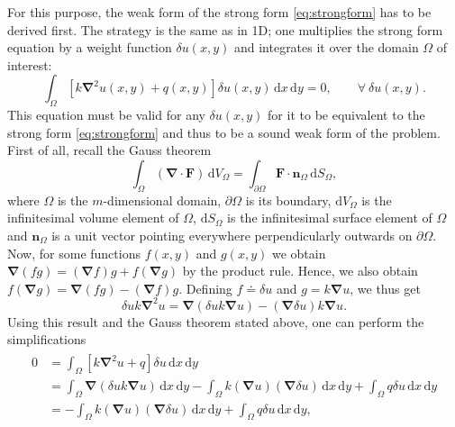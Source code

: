 \documentclass[a4paper,11pt]{article}
\numberwithin{equation}{section}
\newcommand\vect[1]{\ensuremath{\bm{#1}}}
\begin{document}
{For this purpose, the weak form of the strong form \cref{eq:strongform} has to be derived first. The strategy is the same as in 1D; one multiplies the strong form equation by a weight function $\delta u(x,y)$ and integrates it over the domain $\Omega$ of interest:
\begin{equation}\label{eq:weakform}
	\int_{\Omega}\left[k\vect{\nabla}^2 u(x,y) + q(x,y)\right]\delta u(x,y)\,\mathrm{d}x\,\mathrm{d}y = 0, \qquad \forall \ \delta u(x,y).
\end{equation} This equation must be valid for any $\delta u(x,y)$ for it to be equivalent to the strong form \cref{eq:strongform} and thus to be a sound weak form of the problem. First of all, recall the Gauss theorem \begin{equation}
	\int_\Omega (\vect{\nabla}\cdot \vect{F})\,\mathrm{d}V_\Omega = \int_{\partial \Omega} \vect{F}\cdot \vect{n}_\Omega \,\mathrm{d}S_\Omega,
\end{equation} where $\Omega$ is the $m$-dimensional domain, $\partial\Omega$ is its boundary, $\mathrm{d}V_\Omega$ is the infinitesimal volume element of $\Omega$, $\mathrm{d}S_\Omega$ is the infinitesimal surface element of $\Omega$ and $\vect{n}_\Omega$ is a unit vector pointing everywhere perpendicularly outwards on $\partial \Omega$. Now, for some functions $f(x,y)$ and $g(x,y)$ we obtain $\vect{\nabla}(fg) = (\vect{\nabla}f)g + f(\vect{\nabla}g)$ by the product rule. Hence, we also obtain $f(\vect{\nabla}g) = \vect{\nabla}(fg) - (\vect{\nabla}f)g$. Defining $f \doteq \delta u$ and $g = k\vect{\nabla}u$, we thus get \begin{equation}
	\delta u k \vect{\nabla}^2 u = \vect{\nabla}\left(\delta u k\vect{\nabla}u\right) - (\vect{\nabla}\delta u) k \vect{\nabla}u.
\end{equation} Using this result and the Gauss theorem stated above, one can perform the simplifications \begin{align}
	\begin{aligned}
		0 &= \int_{\Omega}\left[k\vect{\nabla}^2 u + q\right]\delta u \,\mathrm{d}x\,\mathrm{d}y \\
		&= \int_\Omega \vect{\nabla}\left(\delta u k\vect{\nabla}u\right)\,\mathrm{d}x\,\mathrm{d}y -\int_\Omega k(\vect{\nabla}u)(\vect{\nabla}\delta u)\,\mathrm{d}x\,\mathrm{d}y + \int_\Omega q \delta u\,\mathrm{d}x\,\mathrm{d}y \\
		&= -\int_\Omega k(\vect{\nabla}u)(\vect{\nabla}\delta u)\,\mathrm{d}x\,\mathrm{d}y + \int_\Omega q \delta u\,\mathrm{d}x\,\mathrm{d}y,
	\end{aligned}

\end{align}}
\end{document}
